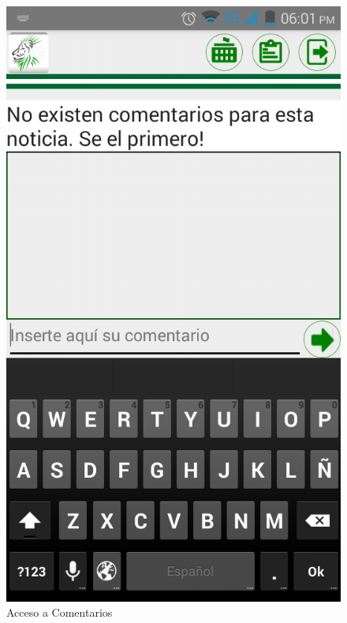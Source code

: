 \begin{figure}
\centering
\includegraphics[scale=0.5]{./android/imagenes/com1.png}
\caption{Acceso a Comentarios}
\label{com1}
\end{figure}

